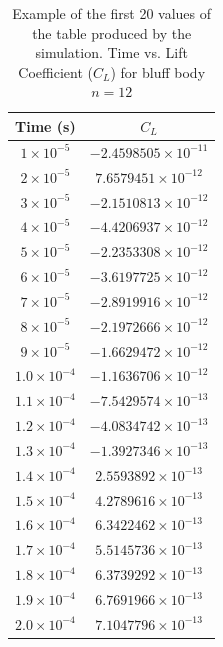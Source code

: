\begin{table}[H]
	\centering
	\begin{tabular}{|c|c|}
		\hline
		\textbf{Time (s)} & \textbf{$C_L$} \\
		\hline
		$1 \times 10^{-5}$  & $-2.4598505 \times 10^{-11}$ \\
		\hline
		$2 \times 10^{-5}$  & $7.6579451 \times 10^{-12}$ \\
		\hline
		$3 \times 10^{-5}$  & $-2.1510813 \times 10^{-12}$ \\
		\hline
		$4 \times 10^{-5}$  & $-4.4206937 \times 10^{-12}$ \\
		\hline
		$5 \times 10^{-5}$  & $-2.2353308 \times 10^{-12}$ \\
		\hline
		$6 \times 10^{-5}$  & $-3.6197725 \times 10^{-12}$ \\
		\hline
		$7 \times 10^{-5}$  & $-2.8919916 \times 10^{-12}$ \\
		\hline
		$8 \times 10^{-5}$  & $-2.1972666 \times 10^{-12}$ \\
		\hline
		$9 \times 10^{-5}$  & $-1.6629472 \times 10^{-12}$ \\
		\hline
		$1.0 \times 10^{-4}$ & $-1.1636706 \times 10^{-12}$ \\
		\hline
		$1.1 \times 10^{-4}$ & $-7.5429574 \times 10^{-13}$ \\
		\hline
		$1.2 \times 10^{-4}$ & $-4.0834742 \times 10^{-13}$ \\
		\hline
		$1.3 \times 10^{-4}$ & $-1.3927346 \times 10^{-13}$ \\
		\hline
		$1.4 \times 10^{-4}$ & $2.5593892 \times 10^{-13}$ \\
		\hline
		$1.5 \times 10^{-4}$ & $4.2789616 \times 10^{-13}$ \\
		\hline
		$1.6 \times 10^{-4}$ & $6.3422462 \times 10^{-13}$ \\
		\hline
		$1.7 \times 10^{-4}$ & $5.5145736 \times 10^{-13}$ \\
		\hline
		$1.8 \times 10^{-4}$ & $6.3739292 \times 10^{-13}$ \\
		\hline
		$1.9 \times 10^{-4}$ & $6.7691966 \times 10^{-13}$ \\
		\hline
		$2.0 \times 10^{-4}$ & $7.1047796 \times 10^{-13}$ \\
		\hline
	\end{tabular}
	\label{tab:12FaceClTable}
	\caption{Example of the first 20 values of the table produced by the simulation. Time vs. Lift Coefficient ($C_L$) for bluff body $n=12$}
\end{table}

